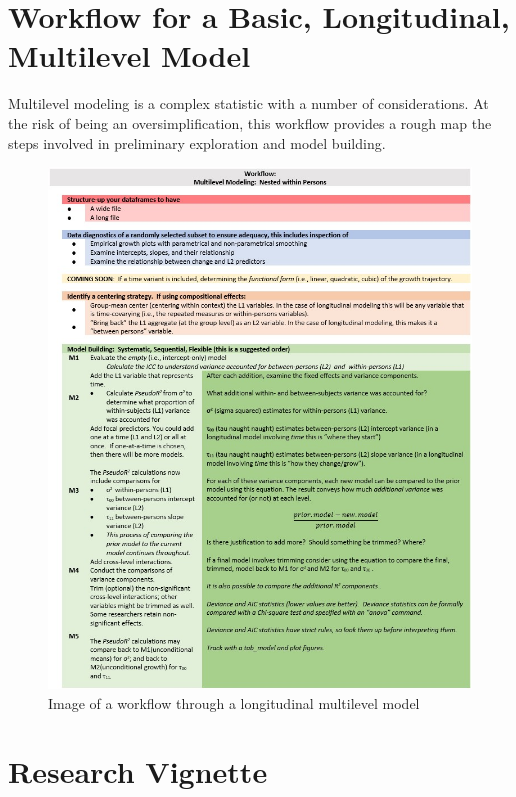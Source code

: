 \documentclass[
  11pt,
]{book}
\begin{document}
\hypertarget{workflow-for-a-basic-longitudinal-multilevel-model}{%
\section{Workflow for a Basic, Longitudinal, Multilevel Model}\label{workflow-for-a-basic-longitudinal-multilevel-model}}

Multilevel modeling is a complex statistic with a number of considerations. At the risk of being an oversimplification, this workflow provides a rough map the steps involved in preliminary exploration and model building.

\begin{figure}
\centering
\includegraphics{images/LongExpl/WrkFlowLong.jpg}
\caption{Image of a workflow through a longitudinal multilevel model}
\end{figure}

\hypertarget{research-vignette-2}{%
\section{Research Vignette}\label{research-vignette-2}}
\end{document}
